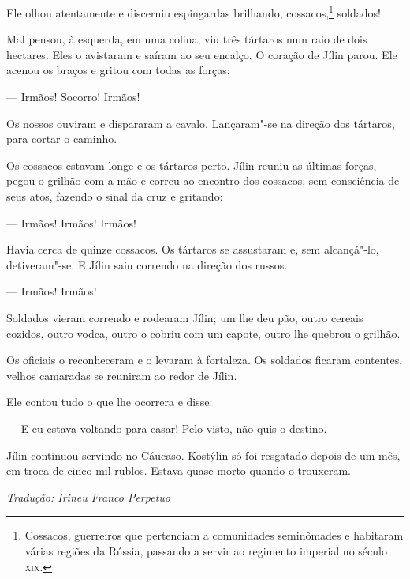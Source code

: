 Ele olhou atentamente e discerniu espingardas brilhando,
cossacos,\footnote{Cossacos, guerreiros que pertenciam a comunidades
  seminômades e habitaram várias regiões da Rússia, passando a servir ao
  regimento imperial no século \textsc{xix}.} soldados!


Mal pensou, à esquerda, em uma colina, viu três tártaros num raio de
dois hectares. Eles o avistaram e saíram ao seu encalço. O coração de
Jílin parou. Ele acenou os braços e gritou com todas as forças:

--- Irmãos! Socorro! Irmãos!

Os nossos ouviram e dispararam a cavalo. Lançaram"-se na direção dos tártaros, para cortar o caminho.

Os cossacos estavam longe e os tártaros perto. Jílin reuniu as últimas
forças, pegou o grilhão com a mão e correu ao encontro dos cossacos, sem
consciência de seus atos, fazendo o sinal da cruz e gritando:

--- Irmãos! Irmãos! Irmãos!

Havia cerca de quinze cossacos. Os tártaros se assustaram e, sem
alcançá"-lo, detiveram"-se. E Jílin saiu correndo na direção dos russos.


--- Irmãos! Irmãos!

Soldados vieram correndo e rodearam Jílin; um lhe deu pão, outro cereais
cozidos, outro vodca, outro o cobriu com um capote, outro lhe quebrou o
grilhão.

Os oficiais o reconheceram e o levaram à fortaleza. Os soldados ficaram
contentes, velhos camaradas se reuniram ao redor de Jílin.

Ele contou tudo o que lhe ocorrera e disse:

--- E eu estava voltando para casar! Pelo visto, não quis o destino.

Jílin continuou servindo no Cáucaso. Kostýlin só foi resgatado depois de
um mês, em troca de cinco mil rublos. Estava quase morto quando o
trouxeram.

\medskip

{\footnotesize\hfill\emph{Tradução: Irineu Franco Perpetuo}}

